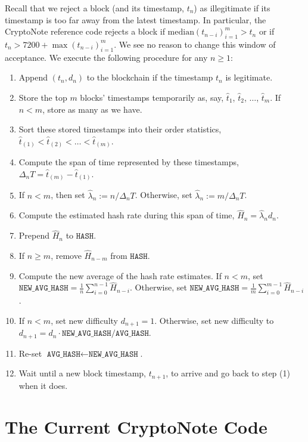 \documentclass[12pt,english]{mrl}
\theoremstyle{definition}
\renewcommand{\geq}{\geqslant}
\numberwithin{equation}{section}
\numberwithin{figure}{section}
\numberwithin{equation}{section}
\numberwithin{equation}{section}
\numberwithin{figure}{section}
\begin{document}
Recall that we reject a block (and its timestamp, $t_n$) as illegitimate if its timestamp is too far away from the latest timestamp. In particular, the CryptoNote reference code rejects a block if $\text{median}(t_{n-i})_{i=1}^{m} > t_n$ or if $t_n > 7200 + \max(t_{n-i})_{i=1}^{m}$. We see no reason to change this window of acceptance.  We execute the following procedure for any $n \geq 1$:
\begin{enumerate}[(1)]
\item Append $(t_n, d_n)$ to the blockchain if the timestamp $t_n$ is legitimate.
\item Store the top $m$ blocks' timestamps temporarily as, say, $\hat{t}_1$, $\hat{t}_2$, $\ldots$, $\hat{t}_{m}$. If $n < m$, store as many as we have.
\item Sort these stored timestamps into their order statistics, $\hat{t}_{(1)} < \hat{t}_{(2)} < \ldots < \hat{t}_{(m)}$.
\item Compute the span of time represented by these timestamps, $\Delta_{n} T = \hat{t}_{(m)} - \hat{t}_{(1)}$. 
\item If $n < m$, then set $\hat{\lambda}_{n} := n/\Delta_n T$. Otherwise, set $\hat{\lambda}_{n} := m/\Delta_n T$.
\item Compute the estimated hash rate during this span of time, $\hat{H}_{n} = \hat{\lambda}_{n} d_{n}$. 
\item Prepend $\hat{H}_n$ to $\texttt{HASH}$.
\item If $n \geq m$, remove $\hat{H}_{n-m}$ from $\texttt{HASH}$.
\item Compute the new average of the hash rate estimates. If $n < m$, set $\texttt{NEW\_AVG\_HASH} = \frac{1}{n} \sum_{i=0}^{n-1} \hat{H}_{n-i}$. Otherwise, set $\texttt{NEW\_AVG\_HASH} = \frac{1}{m} \sum_{i=0}^{m-1} \hat{H}_{n-i}$.
\item If $n < m$, set new difficulty $d_{n+1} = 1$. Otherwise, set new difficulty to $d_{n+1} = d_{n} \cdot \texttt{NEW\_AVG\_HASH}/\texttt{AVG\_HASH}$.
\item Re-set $\texttt{AVG\_HASH} \leftarrow \texttt{NEW\_AVG\_HASH}$. 
\item Wait until a new block timestamp, $t_{n+1}$, to arrive and go back to step (1) when it does.
\end{enumerate}


\section{The Current CryptoNote Code}\label{refCode}
\end{document}
